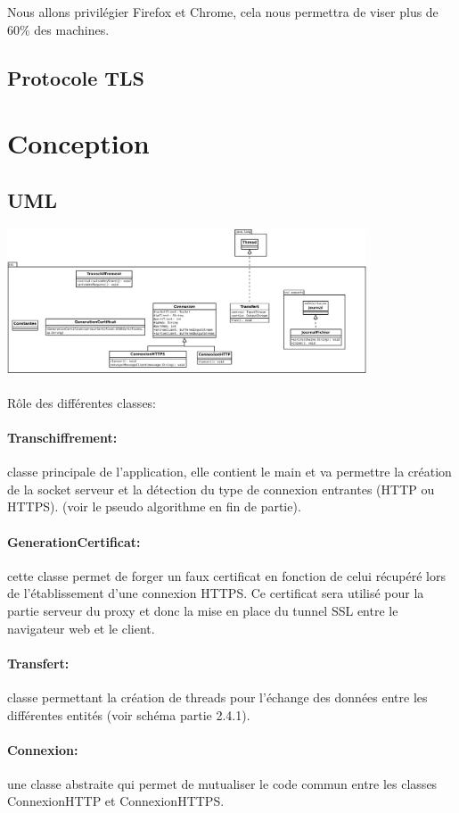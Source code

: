 \documentclass[a4paper,11pt,french]{report}
\begin{document}
Nous allons privilégier Firefox et Chrome, cela nous permettra de viser plus de 60\% des machines.

\subsection{Protocole TLS}


\section{Conception}

\subsection{UML}
\includegraphics[width=0.8\textwidth]{images/uml.pdf}
~~\\
~~\\
Rôle des différentes classes:
	\paragraph{Transchiffrement:} classe principale de l'application, elle contient le main et
	va permettre la création de la socket serveur et la détection du type de connexion entrantes (HTTP ou HTTPS).
	(voir le pseudo algorithme en fin de partie).
	\paragraph{GenerationCertificat:} cette classe permet de forger un faux certificat en fonction
	de celui récupéré lors de l'établissement d'une connexion HTTPS. Ce certificat 
	sera utilisé pour la partie serveur du proxy et donc la mise en place du tunnel 
	SSL entre le navigateur web et le client.
	\paragraph{Transfert:} classe permettant la création de threads pour l'échange
	des données entre les différentes entités (voir schéma partie 2.4.1).
	\paragraph{Connexion:} une classe abstraite qui permet de mutualiser le code commun
	entre les classes ConnexionHTTP et ConnexionHTTPS.
\end{document}
